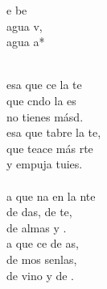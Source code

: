 \begin{cancion}%
	\begin{chorus}%
	e be \\
	 agua v,\\
	 agua a*\\
	\end{chorus}%
	\jump\\
	esa que ce la te \\
	que cndo la es \\
	no tienes másd. \\
	esa que tabre la te,  \\
	que teace más rte  \\
	y empuja tuies.\\
	\jump\\
	a que na en la nte  \\
	de das, de te,  \\
	de almas y . \\
	a que ce de as, \\
	de mos senlas,  \\
	de vino y de . \\
\end{cancion}%
